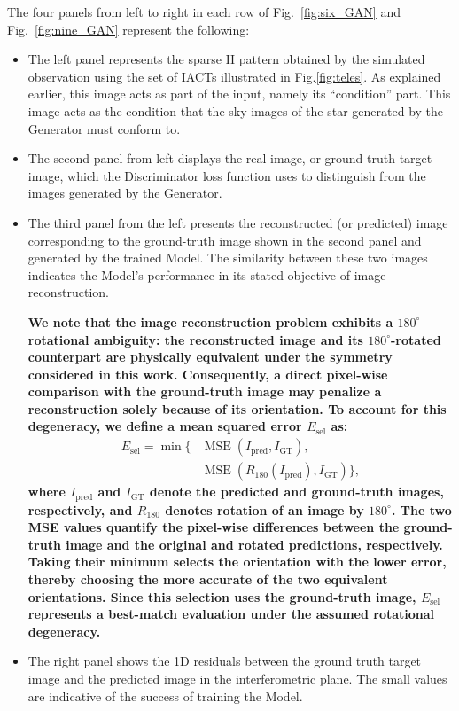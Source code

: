 The four panels from left to right in each row of Fig.~\ref{fig:six_GAN} and Fig.~\ref{fig:nine_GAN} represent the following:
\begin{itemize}
\item{The left panel represents the sparse II pattern obtained by the simulated observation using the set of IACTs illustrated in Fig.\ref{fig:teles}. As explained earlier, this image acts as part of the input, namely its ``condition'' part. This image acts as the condition that the sky-images of the star generated by the Generator must conform to.}
 
\item{The second panel from left displays the real image, or ground truth target image, which the Discriminator loss function uses to distinguish from the images generated by the Generator.}

\item The third panel from the left presents the reconstructed (or predicted) image corresponding to the ground-truth image shown in the second panel and generated by the trained Model. The similarity between these two images indicates the Model's performance in its stated objective of image reconstruction.

\textbf{We note that the image reconstruction problem exhibits a \(180^\circ\) rotational ambiguity: the reconstructed image and its \(180^\circ\)-rotated counterpart are physically equivalent under the symmetry considered in this work. Consequently, a direct pixel-wise comparison with the ground-truth image may penalize a reconstruction solely because of its orientation. To account for this degeneracy, we define a mean squared error \(E_{\mathrm{sel}}\) as:}
\begin{equation}
  \begin{aligned}
	E_{\mathrm{sel}} =
	\min \big\{
	& \operatorname{MSE}(I_{\mathrm{pred}}, I_{\mathrm{GT}}), \\
	& \operatorname{MSE}(R_{180}(I_{\mathrm{pred}}), I_{\mathrm{GT}})
	\big\},
        \end{aligned}
\end{equation}
\textbf{where \(I_{\mathrm{pred}}\) and \(I_{\mathrm{GT}}\) denote the predicted and ground-truth images, respectively, and \(R_{180}\) denotes rotation of an image by \(180^\circ\). The two MSE values quantify the pixel-wise differences between the ground-truth image and the original and rotated predictions,	respectively. Taking their minimum selects the orientation with	the lower error, thereby choosing the more accurate of the two equivalent orientations. Since this selection uses the ground-truth image, \(E_{\mathrm{sel}}\) represents a best-match evaluation under the assumed rotational degeneracy.}

\item{The right panel shows the 1D residuals between the ground truth target image and the predicted image in the interferometric plane. The small values are indicative of the success of training the Model.}
\end{itemize}

